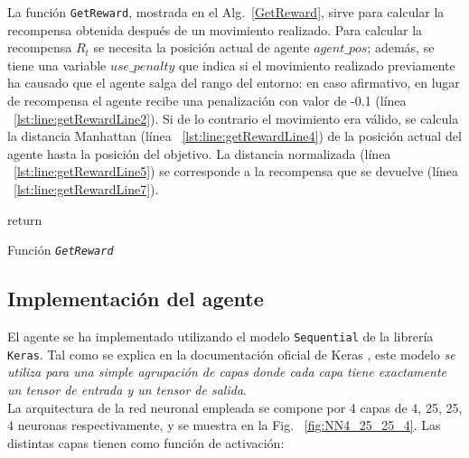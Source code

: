 La función \texttt{GetReward}, mostrada en el Alg.~\ref{GetReward}, sirve para calcular la recompensa obtenida después de un movimiento realizado. Para calcular la recompensa $R_t$ se necesita la posición actual de agente $agent\_pos$; además, se tiene una variable $use\_penalty$ que indica si el movimiento realizado previamente ha causado que el agente salga del rango del entorno: en caso afirmativo, en lugar de recompensa el agente recibe una penalización con valor de -0.1 (línea ~\ref{lst:line:getRewardLine2}). Si de lo contrario el movimiento era válido, se calcula la distancia Manhattan (línea ~\ref{lst:line:getRewardLine4}) de la posición actual del agente hasta la posición del objetivo. La distancia normalizada (línea ~\ref{lst:line:getRewardLine5}) se corresponde a la recompensa que se devuelve (línea ~\ref{lst:line:getRewardLine7}). \\

\begin{algorithm}[H]
\SetAlgoLined
{}
\BlankLine
{}
return \Reward \;\label{lst:line:getRewardLine7}
 \caption{Función \textit{\texttt{GetReward}}} \label{GetReward}
\end{algorithm}

\subsection{Implementación del agente}

El agente se ha implementado utilizando el modelo \texttt{Sequential} de la librería \texttt{Keras}. Tal como se explica en la documentación oficial de Keras \cite{kerasSequential}, este modelo \textit{se utiliza para una simple agrupación de capas donde cada capa tiene exactamente un tensor de entrada y un tensor de salida}. \\

La arquitectura de la red neuronal empleada se compone por 4 capas de 4, 25, 25, 4 neuronas respectivamente, y se muestra en la Fig. ~\ref{fig:NN4_25_25_4}. Las distintas capas tienen como función de activación: 

